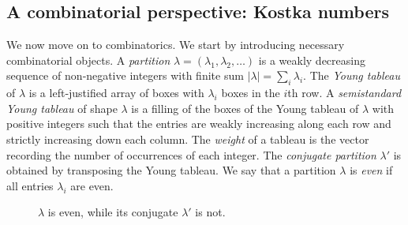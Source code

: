 \documentclass[12pt,a4paper]{extarticle}
\theoremstyle{definition}
\begin{document}
\subsection{A combinatorial perspective: Kostka numbers}\label{per: com}
We now move on to combinatorics. We start by introducing necessary combinatorial objects.
A \emph{partition} $\lambda=(\lambda_1,\lambda_2,\ldots)$ is a weakly decreasing sequence of non‑negative integers with finite sum $|\lambda|=\sum_i \lambda_i$.
The \emph{Young tableau} of $\lambda$ is a left‑justified array of boxes with $\lambda_i$ boxes
in the $i$th row. A \emph{semistandard Young tableau} of shape $\lambda$ is a filling of the boxes of the Young
tableau of $\lambda$ with positive integers such that the entries are weakly increasing along
each row and strictly increasing down each column.
The \emph{weight} of a tableau is the vector recording the number of occurrences of each integer.
The \emph{conjugate partition} $\lambda'$ is obtained by transposing the Young tableau.
We say that a partition $\lambda$ is \emph{even} if all entries $\lambda_i$ are even.
\begin{figure}[ht]
    \centering
{}
\qquad
{}
    \caption{$\lambda$ is even, while its conjugate $\lambda'$ is not. }
    \label{fig:placeholder}
\end{figure}
\end{document}
